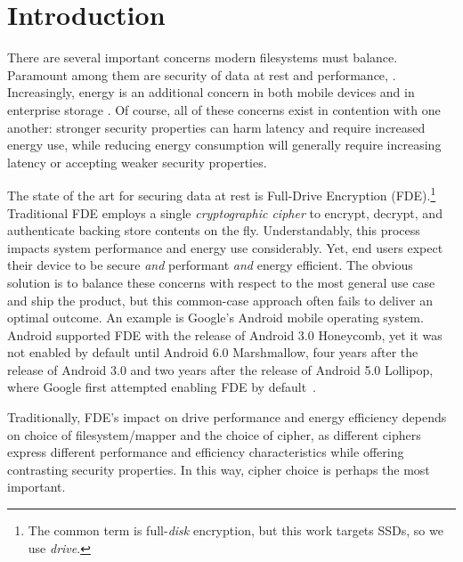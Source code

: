 \section{Introduction}\label{sec:introduction}

There are several important concerns modern filesystems must balance. Paramount
among them are security of data at rest and performance, . Increasingly, energy is an additional concern in both mobile
devices \cite{android-M-mobile-motivation} and in enterprise storage
\cite{enterprise-motivation}. Of course, all of these concerns exist in
contention with one another: stronger security properties can harm latency and
require increased energy use, while reducing energy consumption will generally
require increasing latency or accepting weaker security properties.

The state of the art for securing data at rest is Full-Drive Encryption
(FDE).\footnote{The common term is full-\emph{disk} encryption, but this work
targets SSDs, so we use \emph{drive}.} Traditional FDE employs a single
\emph{cryptographic cipher} to encrypt, decrypt, and authenticate backing store
contents on the fly. Understandably, this process impacts system performance and
energy use considerably. Yet, end users expect their device to be secure
\emph{and} performant \emph{and} energy efficient. The obvious solution is to
balance these concerns with respect to the most general use case and ship the
product, but this common-case approach often fails to deliver an optimal outcome. An example is
Google's Android mobile operating system. Android supported FDE with the release
of Android 3.0 Honeycomb, yet it was not enabled by default until Android 6.0
Marshmallow, four years after the release of Android 3.0 and two years after the
release of Android 5.0 Lollipop, where Google first attempted enabling FDE by
default~\cite{android-M-mobile-motivation}. 

Traditionally, FDE's impact on drive performance and energy efficiency depends
on choice of filesystem/mapper and the choice of cipher, as different ciphers
express different performance and efficiency characteristics while offering
contrasting security properties. In this way, cipher choice is perhaps the most
important.

